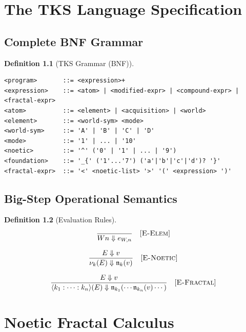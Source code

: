 \documentclass[11pt,twoside,openright]{book}
\theoremstyle{definition}
\newtheorem{definition}{Definition}[chapter]
\theoremstyle{plain}
\theoremstyle{remark}
\newcommand{\noe}[1]{\nu_{#1}}
\begin{document}
\chapter{The TKS Language Specification}
\label{ch:language-spec}

\section{Complete BNF Grammar}

\begin{definition}[TKS Grammar (BNF)]
\label{def:bnf-grammar}
\begin{verbatim}
<program>       ::= <expression>+
<expression>    ::= <atom> | <modified-expr> | <compound-expr> | <fractal-expr>
<atom>          ::= <element> | <acquisition> | <world>
<element>       ::= <world-sym> <mode>
<world-sym>     ::= 'A' | 'B' | 'C' | 'D'
<mode>          ::= '1' | ... | '10'
<noetic>        ::= '^' ('0' | '1' | ... | '9')
<foundation>    ::= '_{' ('1'...'7') ('a'|'b'|'c'|'d')? '}'
<fractal-expr>  ::= '<' <noetic-list> '>' '(' <expression> ')'
\end{verbatim}
\end{definition}

\section{Big-Step Operational Semantics}

\begin{definition}[Evaluation Rules]
\label{def:bigstep}
\[
\frac{}{Wn \Downarrow e_{W,n}} \quad [\textsc{E-Elem}]
\]

\[
\frac{E \Downarrow v}{\noe{k}(E) \Downarrow \mathfrak{n}_k(v)} \quad [\textsc{E-Noetic}]
\]

\[
\frac{E \Downarrow v}{\langle k_1 : \cdots : k_n \rangle(E) \Downarrow \mathfrak{n}_{k_1}(\cdots\mathfrak{n}_{k_n}(v)\cdots)} \quad [\textsc{E-Fractal}]
\]
\end{definition}

\chapter{Noetic Fractal Calculus}
\label{ch:fractal-calculus}
\end{document}
